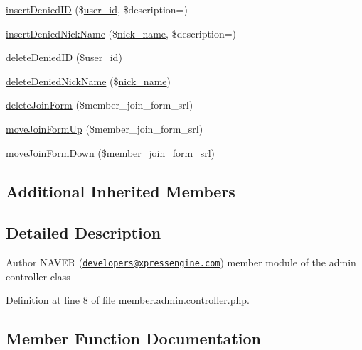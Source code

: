\begin{DoxyCompactItemize}
\item 
\hyperlink{classmemberAdminController_a568d276708e1c5c4cf47d40741909b1a}{insert\+Denied\+ID} (\$\hyperlink{ko_8install_8php_a74f1a394389d774e5b4cd5d1d15413f7}{user\+\_\+id}, \$description=\textquotesingle{}\textquotesingle{})
\item 
\hyperlink{classmemberAdminController_ad636ff0ef0e9dae33a6592d7fd457bc1}{insert\+Denied\+Nick\+Name} (\$\hyperlink{ko_8install_8php_a151ecae87a1f3d7e257aa089803086bd}{nick\+\_\+name}, \$description=\textquotesingle{}\textquotesingle{})
\item 
\hyperlink{classmemberAdminController_af7f02615adb1cbd7b8b91a330bda1a38}{delete\+Denied\+ID} (\$\hyperlink{ko_8install_8php_a74f1a394389d774e5b4cd5d1d15413f7}{user\+\_\+id})
\item 
\hyperlink{classmemberAdminController_a20792ed4ccef3abf09eb3fbd5dd955fb}{delete\+Denied\+Nick\+Name} (\$\hyperlink{ko_8install_8php_a151ecae87a1f3d7e257aa089803086bd}{nick\+\_\+name})
\item 
\hyperlink{classmemberAdminController_a3fbfbbc1a77c7aaaed901e08fd2ec09c}{delete\+Join\+Form} (\$member\+\_\+join\+\_\+form\+\_\+srl)
\item 
\hyperlink{classmemberAdminController_a6ab62c7dab973a7dc4d12b7739d82660}{move\+Join\+Form\+Up} (\$member\+\_\+join\+\_\+form\+\_\+srl)
\item 
\hyperlink{classmemberAdminController_a07d6306d7ed6eadca11fdc8ca9eb10d4}{move\+Join\+Form\+Down} (\$member\+\_\+join\+\_\+form\+\_\+srl)
\end{DoxyCompactItemize}
\subsection*{Additional Inherited Members}


\subsection{Detailed Description}
\begin{DoxyAuthor}{Author}
N\+A\+V\+ER (\href{mailto:developers@xpressengine.com}{\tt developers@xpressengine.\+com}) member module of the admin controller class 
\end{DoxyAuthor}


Definition at line 8 of file member.\+admin.\+controller.\+php.



\subsection{Member Function Documentation}
\mbox{\label{classmemberAdminController_a6e227f85ce71ac94e57e37ecc395613f}} 
